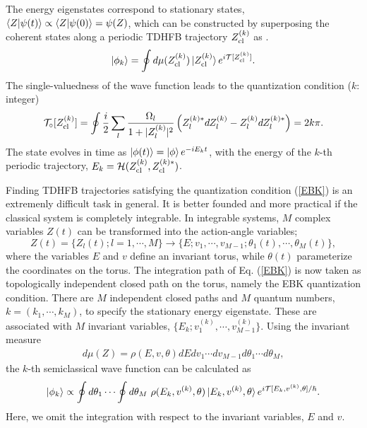 \documentclass[%
superscriptaddress,
preprint,
showpacs,
nofootinbib,
amsmath,amssymb,
prc,
floatfix ]%
{revtex4-1}
\begin{document}
The energy eigenstates correspond to stationary states,
$\braket{Z|\psi(t)} \propto \braket{Z|\psi(0)}=\psi(Z)$,
which can be constructed by superposing the coherent states along
a periodic TDHFB trajectory $Z_{\rm cl}^{(k)}$ as \cite{path,path2,SM88}.
\begin{equation}
	\ket{\phi_k} = \oint d\mu(Z_{\rm cl}^{(k)}) \ket{Z_{\rm cl}^{(k)}}
	e^{i\mathcal{T}[Z_{\rm cl}^{(k)}]} .
\end{equation}
The single-valuedness of the wave function leads to
the quantization condition ($k$: integer)
\begin{equation}
	\mathcal{T}_\circ[Z_{\rm cl}^{(k)}]=
	\oint \frac{i}{2} \sum_l \frac{\Omega_l}{1+|Z_l^{(k)}|^2}
	\left(Z_l^{(k)*} dZ_l^{(k)} - Z_l^{(k)} dZ_l^{(k)*}\right) = 2k\pi .
	\label{EBK}
\end{equation}
The state evolves in time as $\ket{\phi(t)}=\ket{\phi}e^{-iE_k t}$,
with the energy of the $k$-th periodic trajectory,
$E_k=\mathcal{H}(Z_{\rm cl}^{(k)},Z_{\rm cl}^{(k)*})$.

Finding TDHFB trajectories satisfying the quantization condition
(\ref{EBK}) is an extremenly difficult task in general.
It is better founded and more practical
if the classical system is completely integrable.
In integrable systems, $M$ complex variables $Z(t)$ can be transformed into
the action-angle variables;
\begin{equation}
	Z(t) = \{Z_l(t);l=1,\cdots,M \} \rightarrow
	\{E; v_1,\cdots,v_{M-1}; \theta_1(t),\cdots,\theta_M(t)\} ,
\end{equation}
where the variables $E$ and $v$ define an invariant torus,
while $\theta(t)$ parameterize the coordinates on the torus.
The integration path of Eq. (\ref{EBK}) is now taken as topologically
independent closed path on the torus,
namely the EBK quantization condition.
There are $M$ independent closed paths and $M$ quantum numbers,
$k=(k_1,\cdots,k_M)$, to specify the stationary energy eigenstate.
These are associated with $M$ invariant variables,
$\{E_k;v_1^{(k)},\cdots,v_{M-1}^{(k)}\}$.
Using the invariant measure
\begin{align}
  d\mu(Z) = \rho(E,v,\theta) dEdv_1\cdots dv_{M-1}d\theta_1\cdots d\theta_M,
\end{align}
the $k$-th semiclassical wave function can be calculated as
\begin{equation}
  \ket{\phi_k} \propto \oint d\theta_1\cdots \oint d\theta_M \ 
	\rho(E_k,v^{(k)},\theta)
	\ket{E_k,v^{(k)},\theta} e^{i\mathcal{T}[E_k,v^{(k)},\theta]/\hbar} .
  \label{semi_wave_func}
\end{equation}
Here, we omit the integration with respect to the invariant variables,
$E$ and $v$.
\end{document}
